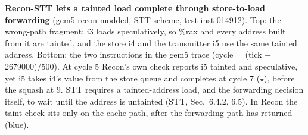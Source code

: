 \textbf{Recon-STT lets a tainted load complete through store-to-load forwarding} (gem5-recon-modded, STT scheme, test inst-014912). Top: the wrong-path fragment; i3 loads speculatively, so \%rax and every address built from it are tainted, and the store i4 and the transmitter i5 use the same tainted address. Bottom: the two instructions in the gem5 trace (cycle = (tick $-$ 2679000)/500). At cycle 5 Recon's own check reports i5 tainted and speculative, yet i5 takes i4's value from the store queue and completes at cycle 7 ($\star$), before the squash at 9. STT requires a tainted-address load, and the forwarding decision itself, to wait until the address is untainted (STT, Sec.~6.4.2, 6.5). In Recon the taint check sits only on the cache path, after the forwarding path has returned (blue).
